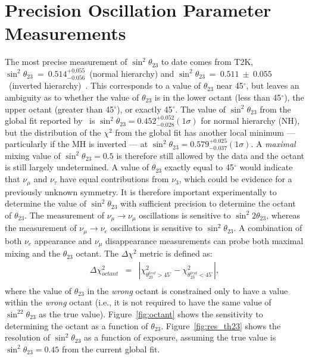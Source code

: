 \section{Precision Oscillation Parameter Measurements}

The most precise measurement of $\sin^2\theta_{23}$ to date comes from T2K, $\sin^2\theta_{23}~=~0.514^{+0.055}_{-0.056}$~(normal hierarchy) and $\sin^2\theta_{23}~=~0.511~\pm~0.055$~(inverted hierarchy)~\cite{Abe:2015awa}.
This corresponds to a value of 
$\theta_{23}$ near 45\mbox{$^{\circ}$}, but leaves an ambiguity
as to whether the value of $\theta_{23}$ is in the lower octant 
(less than 45\mbox{$^{\circ}$}), the upper octant (greater than 45\mbox{$^{\circ}$}),
or exactly 45\mbox{$^{\circ}$}. 
The value of $\sin^2 \theta_{23}$ from
the global fit reported by~\cite{Gonzalez-Garcia:2014bfa} is $\sin ^2 \theta_{23} = 0.452
^{+0.052} _{-0.028} (1 \sigma)$ for normal hierarchy (NH), but the distribution of the $\chi^2$ from
the global fit has another local minimum --- particularly if the MH 
is inverted --- at $\sin^2 \theta_{23} = 0.579 ^{+0.025} _{-0.037} (1 \sigma)$. A
\emph{maximal} mixing value of $\sin^2 \theta_{23} =0.5$ is therefore still allowed
by the data and the octant is still largely undetermined.
A value of $\theta_{23}$ exactly equal to 45\mbox{$^{\circ}$} would indicate that 
$\nu_{\mu}$ and $\nu_{\tau}$ have equal contributions from $\nu_3$,
which could be evidence for a previously unknown symmetry. 
It is
therefore important experimentally to determine the value of
$\sin ^2 \theta_{23}$ 
with sufficient precision to determine 
the octant of $\theta_{23}$. 
The measurement of $\nu_\mu \rightarrow \nu_\mu$ oscillations is
sensitive to $\sin ^2 2 \theta_{23}$, whereas the measurement of
$\nu_\mu \rightarrow \nu_e$ oscillations is sensitive to $\sin^2
\theta_{23}$. 
A combination of both $\nu_e$ appearance and $\nu_\mu$ disappearance
measurements can probe both maximal mixing and the $\theta_{23}$
octant.  The $\Delta\chi^2$ metric is defined as:
\begin{eqnarray}
\Delta\chi^2_{octant} & = & |\chi^2_{\theta_{23}^{test}>45^\circ} - \chi^2_{\theta_{23}^{test}<45^\circ}|, \\ \nonumber
\end{eqnarray}
where the value of $\theta_{23}$ in the \emph{wrong} octant is constrained 
only to have a value within the \emph{wrong} octant (i.e., it is not required
to have the same value of $\sin^22\theta_{23}$ as the true value).
Figure~\ref{fig:octant} shows the sensitivity to determining the octant as a function of $\theta_{23}$.  Figure~\ref{fig:res_th23} shows the resolution of $\sin^2\theta_{23}$ as a function of exposure, assuming the true value is $\sin^2\theta_{23} = 0.45$ from the current global fit.

